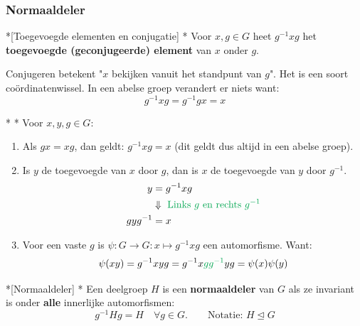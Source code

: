 \newpage
\subsubsection{Normaaldeler}

\begin{nicedefinition}*[Toegevoegde elementen en conjugatie]
    \nextpart[]*
    Voor $x,g \in G$ heet $g^{-1}xg$ het \textcolor{PineGreen!75!black}{\textbf{toegevoegde (geconjugeerde) element}} van $x$ onder $g$.
\end{nicedefinition}

\textbf{} Conjugeren betekent "$x$ bekijken vanuit het standpunt van $g$". Het is een soort coördinatenwissel. In een abelse groep verandert er niets want:
\begin{equation*}
    g^{-1}xg = g^{-1}gx = x
\end{equation*}

\begin{nicetheorem}*
    \nextpart[]*
    Voor $x,y,g \in G$:
    \begin{enumerate}
        \item Als $gx = xg$, dan geldt: $g^{-1}xg=x$ (dit geldt dus altijd in een abelse groep).
        \item Is $y$ de toegevoegde van $x$ door $g$, dan is $x$ de toegevoegde van $y$ door $g^{-1}$.
        \begin{equation*}
            \begin{aligned}
                y &= g^{-1}xg \\
                &\Downarrow \textcolor{Green}{\text{ Links $g$ en rechts $g^{-1}$}}\\
                gyg^{-1} &= x
            \end{aligned}
        \end{equation*}
        \item Voor een vaste $g$ is $\psi : G \to G : x \mapsto g^{-1}xg$ een automorfisme. Want:
        \begin{equation*}
            \psi(xy) = g^{-1}xyg = g^{-1}x\textcolor{Green}{gg^{-1}}yg = \psi(x)\psi(y)
        \end{equation*}
    \end{enumerate}
\end{nicetheorem}

\begin{nicedefinition}*[Normaaldeler]
    \nextpart[]*
    Een deelgroep $H$ is een \textcolor{PineGreen!75!black}{\textbf{normaaldeler}} van $G$ als ze invariant is onder \textbf{alle} innerlijke automorfismen:
    \begin{equation*}
        g^{-1}Hg = H \quad \forall g \in G. \qquad \text{Notatie: } H \trianglelefteq G 
    \end{equation*}
\end{nicedefinition}

